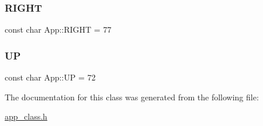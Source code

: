\mbox{\label{class_app_a25eefcb83101cb10090acee7487276bb}} 
\subsubsection{\texorpdfstring{RIGHT}{RIGHT}}
{\footnotesize\ttfamily const char App\+::\+R\+I\+G\+HT = 77\hspace{0.3cm}{\ttfamily [static]}}

\mbox{\label{class_app_a3c5ab3c77f7f03e811b2542106943844}} 
\subsubsection{\texorpdfstring{UP}{UP}}
{\footnotesize\ttfamily const char App\+::\+UP = 72\hspace{0.3cm}{\ttfamily [static]}}



The documentation for this class was generated from the following file\+:\begin{DoxyCompactItemize}
\item 
\mbox{\hyperlink{app__class_8h}{app\+\_\+class.\+h}}\end{DoxyCompactItemize}

